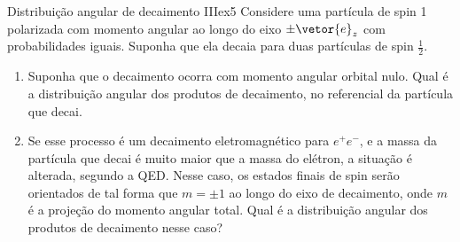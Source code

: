 \begin{exercício}{Distribuição angular de decaimento III}{ex5}
   Considere uma partícula de spin 1 polarizada com momento angular ao longo do eixo \(\pm \vetor{e}_z\) com probabilidades iguais. Suponha que ela decaia para duas partículas de spin \(\frac12.\)
   \begin{enumerate}[label=(\alph*)]
       \item Suponha que o decaimento ocorra com momento angular orbital nulo. Qual é a distribuição angular dos produtos de decaimento, no referencial da partícula que decai.
       \item Se esse processo é um decaimento eletromagnético para \(e^+ e^-\), e a massa da partícula que decai é muito maior que a massa do elétron, a situação é alterada, segundo a QED. Nesse caso, os estados finais de spin serão orientados de tal forma que \(m = \pm 1\) ao longo do eixo de decaimento, onde \(m\) é a projeção do momento angular total. Qual é a distribuição angular dos produtos de decaimento nesse caso?
   \end{enumerate}
\end{exercício}
